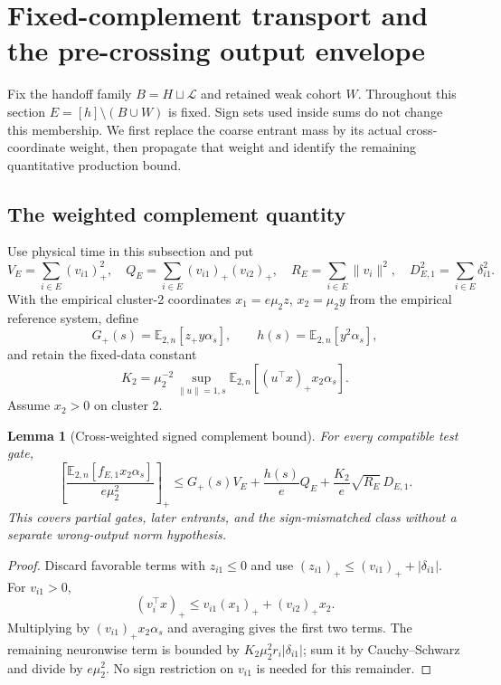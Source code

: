 \documentclass{article} %
\theoremstyle{plain}
\newtheorem{lemma}[theorem]{Lemma}
\theoremstyle{definition}
\theoremstyle{remark}
\begin{document}
\section{Fixed-complement transport and the pre-crossing output envelope}
\label{sbflux:scope}

Fix the handoff family $B=H\sqcup\mathcal L$ and retained weak cohort $W$.
Throughout this section $E=[h]\setminus(B\cup W)$ is fixed. Sign sets used
inside sums do not change this membership. We first replace the coarse
entrant mass by its actual cross-coordinate weight, then propagate that
weight and identify the remaining quantitative production bound.

\subsection{The weighted complement quantity}

Use physical time in this subsection and put
\[
 V_E=\sum_{i\in E}(v_{i1})_+^2,\quad
 Q_E=\sum_{i\in E}(v_{i1})_+(v_{i2})_+,\quad
 R_E=\sum_{i\in E}\|v_i\|^2,\quad
 D_{E,1}^2=\sum_{i\in E}\delta_{i1}^2.
\]
With the empirical cluster-2 coordinates $x_1=e\mu_2z$, $x_2=\mu_2y$
from the empirical reference system, define
\[
 G_+(s)=\mathbb E_{2,n}[z_+y\alpha_s],\qquad
 h(s)=\mathbb E_{2,n}[y^2\alpha_s],
\]
and retain the fixed-data constant
\[
 K_2=\mu_2^{-2}\sup_{\|u\|=1,s}
       \mathbb E_{2,n}[(u^\top x)_+x_2\alpha_s].
\]
Assume $x_2>0$ on cluster 2.

\begin{lemma}[Cross-weighted signed complement bound]
\label{sbflux:output}
For every compatible test gate,
\begin{equation}\label{sbflux:output-bound}
 \left[\frac{\mathbb E_{2,n}[f_{E,1}x_2\alpha_s]}{e\mu_2^2}\right]_+
 \le G_+(s)V_E+\frac{h(s)}e Q_E
       +\frac{K_2}e\sqrt{R_E}\,D_{E,1}.
\end{equation}
This covers partial gates, later entrants, and the sign-mismatched class
without a separate wrong-output norm hypothesis.
\end{lemma}
\begin{proof}
Discard favorable terms with $z_{i1}\le0$ and use
$(z_{i1})_+\le(v_{i1})_++|\delta_{i1}|$.
For $v_{i1}>0$,
\[
 (v_i^\top x)_+\le v_{i1}(x_1)_++(v_{i2})_+x_2.
\]
Multiplying by $(v_{i1})_+x_2\alpha_s$ and averaging gives the first two
terms. The remaining neuronwise term is bounded by
$K_2\mu_2^2r_i|\delta_{i1}|$; sum it by Cauchy--Schwarz and divide by
$e\mu_2^2$. No sign restriction on $v_{i1}$ is needed for this remainder.
\end{proof}
\end{document}
